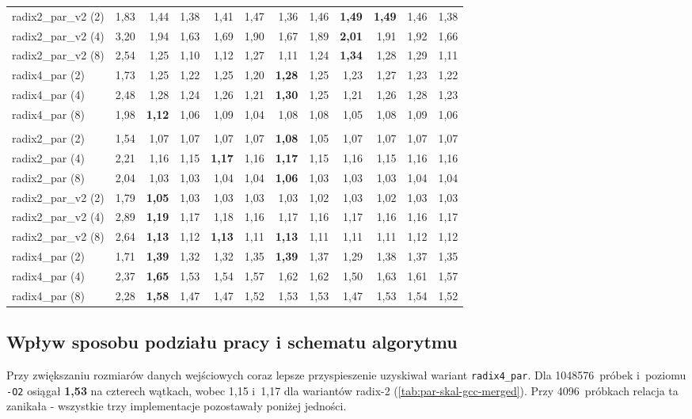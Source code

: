 \begin{table}[H]
\begin{tabular}{lrrrrrrrrrrr}
\addlinespace
radix2\_par\_v2 (2) & 1,83 & 1,44 & 1,38 & 1,41 & 1,47 & 1,36 & 1,46 & \textbf{1,49} & \textbf{1,49} & 1,46 & 1,38 \\
radix2\_par\_v2 (4) & 3,20 & 1,94 & 1,63 & 1,69 & 1,90 & 1,67 & 1,89 & \textbf{2,01} & 1,91 & 1,92 & 1,66 \\
radix2\_par\_v2 (8) & 2,54 & 1,25 & 1,10 & 1,12 & 1,27 & 1,11 & 1,24 & \textbf{1,34} & 1,28 & 1,29 & 1,11 \\
\addlinespace
radix4\_par (2) & 1,73 & 1,25 & 1,22 & 1,25 & 1,20 & \textbf{1,28} & 1,25 & 1,23 & 1,27 & 1,23 & 1,22 \\
radix4\_par (4) & 2,48 & 1,28 & 1,24 & 1,26 & 1,21 & \textbf{1,30} & 1,25 & 1,21 & 1,26 & 1,28 & 1,23 \\
radix4\_par (8) & 1,98 & \textbf{1,12} & 1,06 & 1,09 & 1,04 & 1,08 & 1,08 & 1,05 & 1,08 & 1,09 & 1,06 \\
\addlinespace
\multicolumn{12}{l}{\textit{1048576 próbek}} \\[2pt]
radix2\_par (2) & 1,54 & 1,07 & 1,07 & 1,07 & 1,07 & \textbf{1,08} & 1,05 & 1,07 & 1,07 & 1,07 & 1,07 \\
radix2\_par (4) & 2,21 & 1,16 & 1,15 & \textbf{1,17} & 1,16 & \textbf{1,17} & 1,15 & 1,16 & 1,15 & 1,16 & 1,16 \\
radix2\_par (8) & 2,04 & 1,03 & 1,03 & 1,04 & 1,04 & \textbf{1,06} & 1,03 & 1,03 & 1,03 & 1,04 & 1,04 \\
\addlinespace
radix2\_par\_v2 (2) & 1,79 & \textbf{1,05} & 1,03 & 1,03 & 1,03 & 1,03 & 1,02 & 1,03 & 1,02 & 1,03 & 1,03 \\
radix2\_par\_v2 (4) & 2,89 & \textbf{1,19} & 1,17 & 1,18 & 1,16 & 1,17 & 1,16 & 1,17 & 1,16 & 1,16 & 1,17 \\
radix2\_par\_v2 (8) & 2,64 & \textbf{1,13} & 1,12 & \textbf{1,13} & 1,11 & \textbf{1,13} & 1,11 & 1,11 & 1,11 & 1,12 & 1,12 \\
\addlinespace
radix4\_par (2) & 1,71 & \textbf{1,39} & 1,32 & 1,32 & 1,35 & \textbf{1,39} & 1,37 & 1,29 & 1,38 & 1,37 & 1,35 \\
radix4\_par (4) & 2,37 & \textbf{1,65} & 1,53 & 1,54 & 1,57 & 1,62 & 1,62 & 1,50 & 1,63 & 1,61 & 1,57 \\
radix4\_par (8) & 2,28 & \textbf{1,58} & 1,47 & 1,47 & 1,52 & 1,53 & 1,53 & 1,47 & 1,53 & 1,54 & 1,52 \\
\bottomrule
\end{tabular}
\end{table}
\subsection{Wpływ sposobu podziału pracy i schematu algorytmu}
Przy zwiększaniu rozmiarów danych wejściowych coraz lepsze przyspieszenie uzyskiwał wariant
 \texttt{radix4\_par}. Dla 1048576~próbek i~poziomu \texttt{-O2} osiągał \textbf{1,53} na
czterech wątkach, wobec 1,15 i~1,17 dla wariantów radix-2
(\cref{tab:par-skal-gcc-merged}). Przy 4096~próbkach relacja ta zanikała -
wszystkie trzy implementacje pozostawały poniżej jedności.

